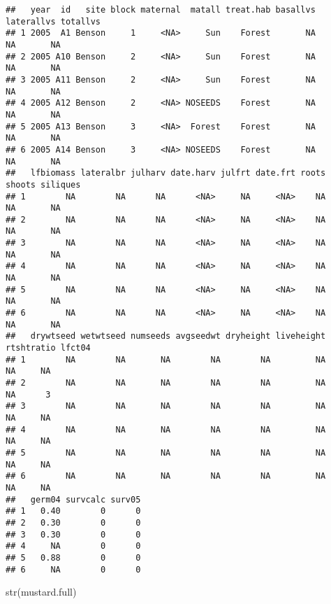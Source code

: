 \documentclass[
]{article}
\newenvironment{Shaded}{\begin{snugshade}}{\end{snugshade}}
\newcommand{\FunctionTok}[1]{\textcolor[rgb]{0.00,0.00,0.00}{#1}}
\newcommand{\NormalTok}[1]{#1}
\begin{document}
\begin{verbatim}
##   year  id   site block maternal  matall treat.hab basallvs laterallvs totallvs
## 1 2005  A1 Benson     1     <NA>     Sun    Forest       NA         NA       NA
## 2 2005 A10 Benson     2     <NA>     Sun    Forest       NA         NA       NA
## 3 2005 A11 Benson     2     <NA>     Sun    Forest       NA         NA       NA
## 4 2005 A12 Benson     2     <NA> NOSEEDS    Forest       NA         NA       NA
## 5 2005 A13 Benson     3     <NA>  Forest    Forest       NA         NA       NA
## 6 2005 A14 Benson     3     <NA> NOSEEDS    Forest       NA         NA       NA
##   lfbiomass lateralbr julharv date.harv julfrt date.frt roots shoots siliques
## 1        NA        NA      NA      <NA>     NA     <NA>    NA     NA       NA
## 2        NA        NA      NA      <NA>     NA     <NA>    NA     NA       NA
## 3        NA        NA      NA      <NA>     NA     <NA>    NA     NA       NA
## 4        NA        NA      NA      <NA>     NA     <NA>    NA     NA       NA
## 5        NA        NA      NA      <NA>     NA     <NA>    NA     NA       NA
## 6        NA        NA      NA      <NA>     NA     <NA>    NA     NA       NA
##   drywtseed wetwtseed numseeds avgseedwt dryheight liveheight rtshtratio lfct04
## 1        NA        NA       NA        NA        NA         NA         NA     NA
## 2        NA        NA       NA        NA        NA         NA         NA      3
## 3        NA        NA       NA        NA        NA         NA         NA     NA
## 4        NA        NA       NA        NA        NA         NA         NA     NA
## 5        NA        NA       NA        NA        NA         NA         NA     NA
## 6        NA        NA       NA        NA        NA         NA         NA     NA
##   germ04 survcalc surv05
## 1   0.40        0      0
## 2   0.30        0      0
## 3   0.30        0      0
## 4     NA        0      0
## 5   0.88        0      0
## 6     NA        0      0
\end{verbatim}

\begin{Shaded}
\begin{Highlighting}[]
\FunctionTok{str}\NormalTok{(mustard.full)}
\end{Highlighting}
\end{Shaded}
\end{document}
